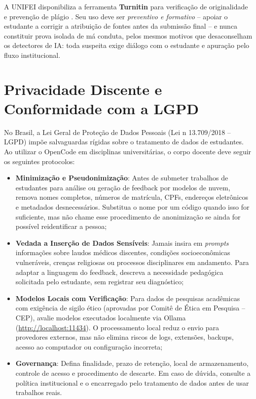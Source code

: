 A UNIFEI disponibiliza a ferramenta \textbf{Turnitin} para verifica{\c c}{\~a}o de originalidade e preven{\c c}{\~a}o de pl{\'a}gio \cite{unifei2026guia}. Seu uso deve ser \emph{preventivo e formativo} -- apoiar o estudante a corrigir a atribui{\c c}{\~a}o de fontes antes da submiss{\~a}o final -- e nunca constituir prova isolada de m{\'a} conduta, pelos mesmos motivos que desaconselham os detectores de IA: toda suspeita exige di{\'a}logo com o estudante e apura{\c c}{\~a}o pelo fluxo institucional.

\section{Privacidade Discente e Conformidade com a LGPD}

No Brasil, a Lei Geral de Prote{\c c}{\~a}o de Dados Pessoais (Lei n{\textordmasculine} 13.709/2018 -- LGPD) imp{\~o}e salvaguardas r{\'i}gidas sobre o tratamento de dados de estudantes. Ao utilizar o OpenCode em disciplinas universit{\'a}rias, o corpo docente deve seguir os seguintes protocolos:

\begin{itemize}
  \item \textbf{Minimiza{\c c}{\~a}o e Pseudonimiza{\c c}{\~a}o}: Antes de submeter trabalhos de estudantes para an{\'a}lise ou gera{\c c}{\~a}o de feedback por modelos de nuvem, remova nomes completos, n{\'u}meros de matr{\'i}cula, CPFs, endere{\c c}os eletr{\^o}nicos e metadados desnecess{\'a}rios. Substitua o nome por um c{\'o}digo quando isso for suficiente, mas n{\~a}o chame esse procedimento de anonimiza{\c c}{\~a}o se ainda for poss{\'i}vel reidentificar a pessoa;
  \item \textbf{Vedada a Inser{\c c}{\~a}o de Dados Sens{\'i}veis}: Jamais insira em \emph{prompts} informa{\c c}{\~o}es sobre laudos m{\'e}dicos discentes, condi{\c c}{\~o}es socioecon{\^o}micas vulner{\'a}veis, cren{\c c}as religiosas ou processos disciplinares em andamento. Para adaptar a linguagem do feedback, descreva a necessidade pedag{\'o}gica solicitada pelo estudante, sem registrar seu diagn{\'o}stico;
  \item \textbf{Modelos Locais com Verifica{\c c}{\~a}o}: Para dados de pesquisas acad{\^e}micas com exig{\^e}ncia de sigilo {\'e}tico (aprovadas por Comit{\^e} de {\'E}tica em Pesquisa -- CEP), avalie modelos executados localmente via Ollama (\url{http://localhost:11434}). O processamento local reduz o envio para provedores externos, mas n{\~a}o elimina riscos de logs, extens{\~o}es, backups, acesso ao computador ou configura{\c c}{\~a}o incorreta;
  \item \textbf{Governan{\c c}a}: Defina finalidade, prazo de reten{\c c}{\~a}o, local de armazenamento, controle de acesso e procedimento de descarte. Em caso de d{\'u}vida, consulte a pol{\'i}tica institucional e o encarregado pelo tratamento de dados antes de usar trabalhos reais.
\end{itemize}

